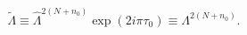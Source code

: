 \begin{equation}
\tilde{\Lambda}\equiv \hat{\Lambda}^{2(N+n_{0})}\exp \left( 2i\pi \tau
_{0}\right) \equiv \Lambda ^{2(N+n_{0})}.
\end{equation}

